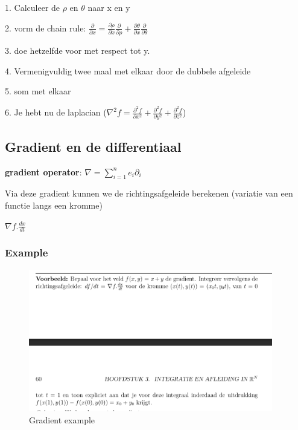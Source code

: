 \documentclass[a4paper]{report}
\begin{document}
1. Calculeer de $\rho$ en $\theta$ naar x en y

2. vorm de chain rule: $\frac{\partial}{\partial x} = \frac{\partial \rho}{\partial x} \frac{\partial}{\partial \rho} + \frac{\partial \theta}{\partial x} \frac{\partial}{\partial \theta}$

3. doe hetzelfde voor met respect tot y.

4. Vermenigvuldig twee maal met elkaar door de dubbele afgeleide

5. som met elkaar

6. Je hebt nu de laplacian ($\nabla^2 f = \frac{\partial^2 f}{\partial x^2} + \frac{\partial^2 f}{\partial y^2} + \frac{\partial^2 f}{\partial z^2}$)

\subsection{Gradient en de differentiaal}

\textbf{gradient operator}: $\nabla = \sum_{i=1}^{n} e_i \partial_i$

Via deze gradient kunnen we de richtingsafgeleide berekenen (variatie van een functie langs een kromme)

$\nabla f . \frac{dx}{dt}$

\subsubsection{Example}

\begin{figure}[H]
	\begin{center}
		\includegraphics[width=0.95\textwidth]{./images/gradient.png}
	\end{center}
	\caption{Gradient example}
	\label{}
\end{figure}
\end{document}
